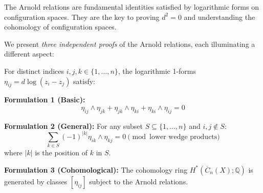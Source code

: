 The Arnold relations are fundamental identities satisfied by logarithmic forms on configuration spaces. They are the key to proving $d^2 = 0$ and understanding the cohomology of configuration spaces.

We present \emph{three independent proofs} of the Arnold relations, each illuminating a different aspect:

\begin{theorem}\label{thm:arnold-three}
For distinct indices $i, j, k \in \{1, \ldots, n\}$, the logarithmic 1-forms $\eta_{ij} = d\log(z_i - z_j)$ satisfy:

\textbf{Formulation 1 (Basic):}
$$\eta_{ij} \wedge \eta_{jk} + \eta_{jk} \wedge \eta_{ki} + \eta_{ki} \wedge \eta_{ij} = 0$$

\textbf{Formulation 2 (General):}
For any subset $S \subseteq \{1, \ldots, n\}$ and $i, j \notin S$:
$$\sum_{k \in S} (-1)^{|k|} \eta_{ik} \wedge \eta_{kj} = 0 \pmod{\text{lower wedge products}}$$
where $|k|$ is the position of $k$ in $S$.

\textbf{Formulation 3 (Cohomological):}
The cohomology ring $H^*(\overline{C}_n(X); \mathbb{Q})$ is generated by classes $[\eta_{ij}]$ subject to the Arnold relations.
\end{theorem}

